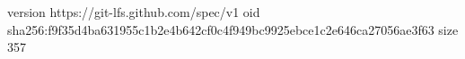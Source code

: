 version https://git-lfs.github.com/spec/v1
oid sha256:f9f35d4ba631955c1b2e4b642cf0c4f949bc9925ebce1c2e646ca27056ae3f63
size 357
